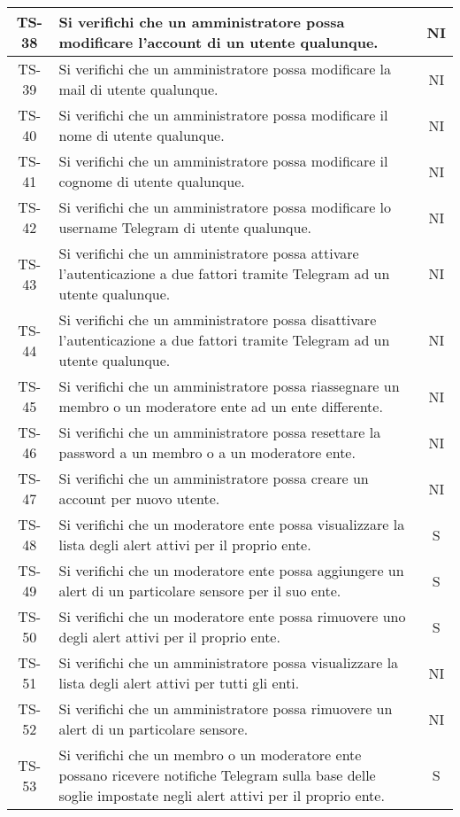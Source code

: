 \begin{center}
\begin{longtable}{|c|p{10cm}|c|}
			 TS-38 & Si verifichi che un amministratore possa modificare l'account di un utente qualunque. & NI \\
			 \hline
			 TS-39 & Si verifichi che un amministratore possa modificare la mail di utente qualunque. & NI \\
			 \hline
			 TS-40 & Si verifichi che un amministratore possa modificare il nome di utente qualunque. & NI \\
			 \hline
			 TS-41 & Si verifichi che un amministratore possa modificare il cognome di utente qualunque. & NI \\
			 \hline
			 TS-42 & Si verifichi che un amministratore possa modificare lo username Telegram di utente qualunque. & NI \\
			 \hline
			 TS-43 & Si verifichi che un amministratore possa attivare l'autenticazione a due fattori tramite Telegram ad un utente qualunque. & NI \\
			 \hline
			 TS-44 & Si verifichi che un amministratore possa disattivare l'autenticazione a due fattori tramite Telegram ad un utente qualunque. & NI \\
			 \hline
			 TS-45 & Si verifichi che un amministratore possa riassegnare un membro o un moderatore ente ad un ente differente. & NI \\
			 \hline
			 TS-46 & Si verifichi che un amministratore possa resettare la password a un membro o a un moderatore ente. & NI \\
			 \hline
			 TS-47 & Si verifichi che un amministratore possa creare un account per nuovo utente. & NI \\
			 \hline
			 TS-48 & Si verifichi che un moderatore ente possa visualizzare la lista degli alert attivi per il proprio ente. & S \\
			 \hline
			 TS-49 & Si verifichi che un moderatore ente possa aggiungere un alert di un particolare sensore per il suo ente. & S \\
			 \hline
			 TS-50 & Si verifichi che un moderatore ente possa rimuovere uno degli alert attivi per il proprio ente. & S \\
			 \hline
			 TS-51 & Si verifichi che un amministratore possa visualizzare la lista degli alert attivi per tutti gli enti. & NI \\
			 \hline
			 TS-52 & Si verifichi che un amministratore possa rimuovere un alert di un particolare sensore. & NI \\
			 \hline
			 TS-53 & Si verifichi che un membro o un moderatore ente possano ricevere notifiche Telegram sulla base delle soglie impostate negli alert attivi per il proprio ente. & S \\

\end{longtable}
\end{center}
